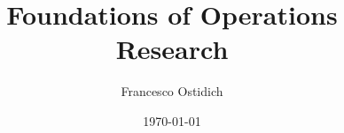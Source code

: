 
\title{\Huge Foundations of Operations Research}
\author{Francesco Ostidich}
\date{\today}
\maketitle
\vspace{12mm}
\tableofcontents
\newpage










